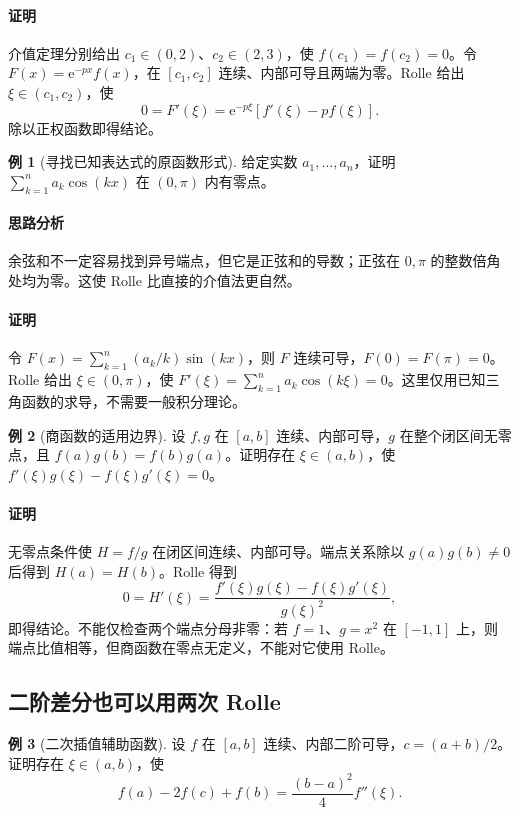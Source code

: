 \documentclass[UTF8,fontset=fandol,12pt,oneside,openany]{ctexrep}
\newcommand{\ee}{\mathrm e}
\theoremstyle{definition}
\newtheorem{example}{例}[chapter]
\begin{document}
\paragraph{证明}
介值定理分别给出 $c_1\in(0,2)$、$c_2\in(2,3)$，使 $f(c_1)=f(c_2)=0$。令 $F(x)=\ee^{-px}f(x)$，在 $[c_1,c_2]$ 连续、内部可导且两端为零。Rolle 给出 $\xi\in(c_1,c_2)$，使
\[
0=F'(\xi)=\ee^{-p\xi}[f'(\xi)-pf(\xi)].
\]
除以正权函数即得结论。

\begin{example}[寻找已知表达式的原函数形式]
给定实数 $a_1,\ldots,a_n$，证明 $\sum_{k=1}^na_k\cos(kx)$ 在 $(0,\pi)$ 内有零点。
\end{example}
\paragraph{思路分析}
余弦和不一定容易找到异号端点，但它是正弦和的导数；正弦在 $0,\pi$ 的整数倍角处均为零。这使 Rolle 比直接的介值法更自然。
\paragraph{证明}
令 $F(x)=\sum_{k=1}^n(a_k/k)\sin(kx)$，则 $F$ 连续可导，$F(0)=F(\pi)=0$。Rolle 给出 $\xi\in(0,\pi)$，使 $F'(\xi)=\sum_{k=1}^na_k\cos(k\xi)=0$。这里仅用已知三角函数的求导，不需要一般积分理论。

\begin{example}[商函数的适用边界]
设 $f,g$ 在 $[a,b]$ 连续、内部可导，$g$ 在整个闭区间无零点，且 $f(a)g(b)=f(b)g(a)$。证明存在 $\xi\in(a,b)$，使 $f'(\xi)g(\xi)-f(\xi)g'(\xi)=0$。
\end{example}
\paragraph{证明}
无零点条件使 $H=f/g$ 在闭区间连续、内部可导。端点关系除以 $g(a)g(b)\ne0$ 后得到 $H(a)=H(b)$。Rolle 得到
\[
0=H'(\xi)=\frac{f'(\xi)g(\xi)-f(\xi)g'(\xi)}{g(\xi)^2},
\]
即得结论。不能仅检查两个端点分母非零：若 $f=1$、$g=x^2$ 在 $[-1,1]$ 上，则端点比值相等，但商函数在零点无定义，不能对它使用 Rolle。

\subsection{二阶差分也可以用两次 Rolle}
\begin{example}[二次插值辅助函数]\label{lec:06:second-difference}
设 $f$ 在 $[a,b]$ 连续、内部二阶可导，$c=(a+b)/2$。证明存在 $\xi\in(a,b)$，使
\[
f(a)-2f(c)+f(b)=\frac{(b-a)^2}{4}f''(\xi).
\]
\end{example}
\end{document}
